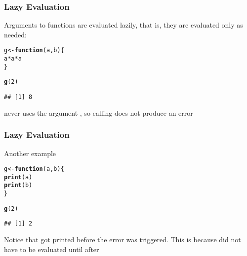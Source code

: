 \documentclass[12pt]{beamer}\usepackage[]{graphicx}\usepackage[]{color}
\makeatletter
\newcommand{\hlnum}[1]{\textcolor[rgb]{0.686,0.059,0.569}{#1}}%
\newcommand{\hlopt}[1]{\textcolor[rgb]{0,0,0}{#1}}%
\newcommand{\hlstd}[1]{\textcolor[rgb]{0.345,0.345,0.345}{#1}}%
\newcommand{\hlkwa}[1]{\textcolor[rgb]{0.161,0.373,0.58}{\textbf{#1}}}%
\newcommand{\hlkwb}[1]{\textcolor[rgb]{0.69,0.353,0.396}{#1}}%
\newcommand{\hlkwc}[1]{\textcolor[rgb]{0.333,0.667,0.333}{#1}}%
\newcommand{\hlkwd}[1]{\textcolor[rgb]{0.737,0.353,0.396}{\textbf{#1}}}%
\newenvironment{kframe}{%
 \def\at@end@of@kframe{}%
 \ifinner\ifhmode%
  \def\at@end@of@kframe{\end{minipage}}%
  \begin{minipage}{\columnwidth}%
 \fi\fi%
 \def\FrameCommand##1{\hskip\@totalleftmargin \hskip-\fboxsep
 \colorbox{shadecolor}{##1}\hskip-\fboxsep
     \hskip-\linewidth \hskip-\@totalleftmargin \hskip\columnwidth}%
 \MakeFramed {\advance\hsize-\width
   \@totalleftmargin\z@ \linewidth\hsize
   \@setminipage}}%
 {\par\unskip\endMakeFramed%
 \at@end@of@kframe}
\newenvironment{knitrout}{}{} %
\makeatother
\begin{document}
\begin{frame}[fragile]
\frametitle{Lazy Evaluation}

Arguments to functions are evaluated lazily, that is, they are evaluated only as needed:
\begin{knitrout}\footnotesize
{}\color{fgcolor}\begin{kframe}
\begin{alltt}
\hlstd{g} \hlkwb{<-} \hlkwa{function}\hlstd{(}\hlkwc{a}\hlstd{,} \hlkwc{b}\hlstd{) \{}
  \hlstd{a} \hlopt{*} \hlstd{a} \hlopt{*} \hlstd{a}
\hlstd{\}}

\hlkwd{g}\hlstd{(}\hlnum{2}\hlstd{)}
\end{alltt}
\begin{verbatim}
## [1] 8
\end{verbatim}
\end{kframe}
\end{knitrout}

 never uses the argument , so calling  does not produce an error

\end{frame}


\begin{frame}[fragile]
\frametitle{Lazy Evaluation}

Another example
\begin{knitrout}\footnotesize
{}\color{fgcolor}\begin{kframe}
\begin{alltt}
\hlstd{g} \hlkwb{<-} \hlkwa{function}\hlstd{(}\hlkwc{a}\hlstd{,} \hlkwc{b}\hlstd{) \{}
  \hlkwd{print}\hlstd{(a)}
  \hlkwd{print}\hlstd{(b)}
\hlstd{\}}

\hlkwd{g}\hlstd{(}\hlnum{2}\hlstd{)}
\end{alltt}
\begin{verbatim}
## [1] 2
\end{verbatim}


{\ttfamily\noindent\bfseries{}}\end{kframe}
\end{knitrout}

Notice that  got printed before the error was triggered. This is because  did not have to be evaluated until after 

\end{frame}
\end{document}
